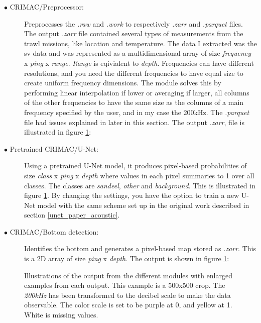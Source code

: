             \begin{description}
              \item[$\bullet$ CRIMAC/Preprocessor:] Preprocesses the \textit{.raw} and \textit{.work} to respectively \textit{.zarr} and \textit{.parquet} files. The output \textit{.zarr} file contained several types of measurements from the trawl missions, like location and temperature. The data I extracted was the \gls{sv} data and was represented as a multidimensional array of size \textit{frequency} x \textit{ping} x \textit{range}. \textit{Range} is eqivialent to \textit{depth}. Frequencies can have different resolutions, and you need the different frequencies to have equal size to create uniform frequency dimensions. The module solves this by performing linear interpolation if lower or averaging if larger, all columns of the other frequencies to have the same size as the columns of a main frequency specified by the user, and in my case the 200kHz.  The \textit{.parquet} file had issues explained in later in this section. The output \textit{.zarr}, file is illustrated in figure \ref{Module_outputs_illustration_fig}:

              \item[$\bullet$ Pretrained CRIMAC/U-Net:] Using a pretrained U-Net model, it produces pixel-based probabilities of size \textit{class} x \textit{ping} x \textit{depth} where values in each pixel summaries to 1 over all classes. The classes are \textit{sandeel}, \textit{other} and \textit{background}. This is illustrated in figure \ref{Module_outputs_illustration_fig}.  By changing the settings, you have the option to train a new U-Net model with the same scheme set up in the original work described in section \ref{unet_paper_acoustic}.
              
              \item[$\bullet$ CRIMAC/Bottom detection:] Identifies the bottom and generates a pixel-based map stored as \textit{.zarr}. This is a 2D array of size \textit{ping} x \textit{depth}. The output is shown in figure \ref{Module_outputs_illustration_fig}:

            \end{description}
            
        
        \begin{figure}[H]
            \centering
            
            \caption[Module outputs illustration]{Illustrations of the output from the different modules with enlarged examples from each output. This example is a 500x500 crop. The \textit{200kHz} has been transformed to the decibel scale to make the data observable. The color scale is set to be purple at 0, and yellow at 1. White is missing values.}
          	\medskip 
            \label{Module_outputs_illustration_fig}
        \end{figure}
            
